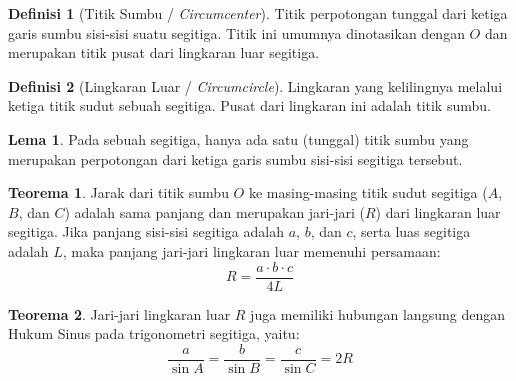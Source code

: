 ﻿\documentclass[aspectratio=169]{beamer}
\theoremstyle{definition}
\newtheorem{definisi}{Definisi}
\newtheorem{teorema}{Teorema}
\newtheorem{lema}{Lema}
\begin{document}
\begin{frame}{\insertsection}{\insertsubsection}
  \begin{definisi}[Titik Sumbu / \textit{Circumcenter}]
    Titik perpotongan tunggal dari ketiga garis sumbu sisi-sisi suatu segitiga. Titik ini umumnya dinotasikan dengan $O$ dan merupakan titik pusat dari lingkaran luar segitiga.
  \end{definisi}

  \begin{definisi}[Lingkaran Luar / \textit{Circumcircle}]
    Lingkaran yang kelilingnya melalui ketiga titik sudut sebuah segitiga. Pusat dari lingkaran ini adalah titik sumbu.
  \end{definisi}

  \begin{lema}
    Pada sebuah segitiga, hanya ada satu (tunggal) titik sumbu yang merupakan perpotongan dari ketiga garis sumbu sisi-sisi segitiga tersebut.
  \end{lema}
\end{frame}

\begin{frame}{\insertsection}{\insertsubsection}
  \begin{teorema}
    Jarak dari titik sumbu $O$ ke masing-masing titik sudut segitiga ($A$, $B$, dan $C$) adalah sama panjang dan merupakan jari-jari ($R$) dari lingkaran luar segitiga. Jika panjang sisi-sisi segitiga adalah $a$, $b$, dan $c$, serta luas segitiga adalah $L$, maka panjang jari-jari lingkaran luar memenuhi persamaan:
    \[
      R = \frac{a \cdot b \cdot c}{4L}
    \]
  \end{teorema}

  \begin{teorema}
    Jari-jari lingkaran luar $R$ juga memiliki hubungan langsung dengan Hukum Sinus pada trigonometri segitiga, yaitu:
    \[
      \frac{a}{\sin A} = \frac{b}{\sin B} = \frac{c}{\sin C} = 2R
    \]
  \end{teorema}

\end{frame}
\end{document}
